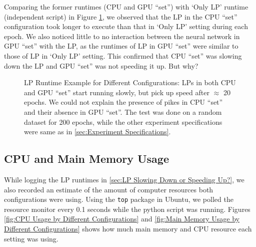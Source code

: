\begin{appendices}
    Comparing the former runtimes (CPU and GPU ``set'') with `Only LP' runtime (independent script) in Figure \ref{fig:LP Runtime Example for Different Configurations}, we observed that the LP in the CPU ``set'' configuration took longer to execute than that in  `Only LP' setting during each epoch. We also noticed little to no interaction between the neural network in GPU ``set'' with the LP, as the runtimes of LP in GPU ``set'' were similar to those of LP in `Only LP' setting. This confirmed that CPU ``set'' was slowing down the LP and GPU ``set'' was not speeding it up. But why?
    \begin{figure}[!htbp]
        \centering
        \caption[LP Runtime Example for Different Configurations]{LP Runtime Example for Different Configurations: LPs in both CPU and GPU ``set'' start running slowly, but pick up speed after $\approx$ 20 epochs. We could not explain the presence of pikes in CPU ``set'' and their absence in GPU ``set''. The test was done on a random dataset for 200 epochs, while the other experiment specifications were same as in \cref{sec:Experiment Specifications}.}
        \label{fig:LP Runtime Example for Different Configurations}
    \end{figure}
    
    \subsection{CPU and Main Memory Usage} \label{sec:CPU and Main Memory Usage}
    While logging the LP runtimes in \cref{sec:LP Slowing Down or Speeding Up?}, we also recorded an estimate of the amount of computer resources both configurations were using. Using the \texttt{top} package in Ubuntu, we polled the resource monitor every 0.1 seconds while the python script was running. Figures \ref{fig:CPU Usage by Different Configurations} and \ref{fig:Main Memory Usage by Different Configurations} shows how much main memory and CPU resource each setting was using.
    

\end{appendices}
